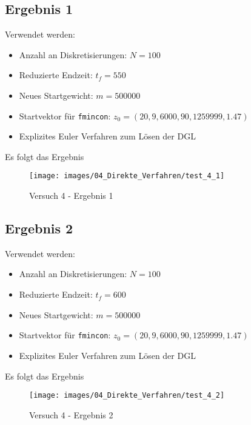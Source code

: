 \subsection{Ergebnis 1}
Verwendet werden:
\begin{itemize}
\item Anzahl an Diskretisierungen: $N = 100$ 
\item Reduzierte Endzeit: $t_f = 550$
\item Neues Startgewicht: $m = 500000$
\item Startvektor für \texttt{fmincon}: $z_0 = (20,9,6000,90,1259999,1.47)$
\item Explizites Euler Verfahren zum Lösen der DGL
\end{itemize}
Es folgt das Ergebnis
\begin{figure}[H]
\begin{center}
\texttt{[image: images/04\_Direkte\_Verfahren/test\_4\_1]}
\caption{Versuch 4 - Ergebnis 1}\label{img:test_4_1}
\end{center}
\end{figure}

\newpage
\subsection{Ergebnis 2}
Verwendet werden:
\begin{itemize}
\item Anzahl an Diskretisierungen: $N = 100$ 
\item Reduzierte Endzeit: $t_f = 600$
\item Neues Startgewicht: $m = 500000$
\item Startvektor für \texttt{fmincon}: $z_0 = (20,9,6000,90,1259999,1.47)$
\item Explizites Euler Verfahren zum Lösen der DGL
\end{itemize}
Es folgt das Ergebnis
\begin{figure}[H]
\begin{center}
\texttt{[image: images/04\_Direkte\_Verfahren/test\_4\_2]}
\caption{Versuch 4 - Ergebnis 2}\label{img:test_4_2}
\end{center}
\end{figure}

\newpage
